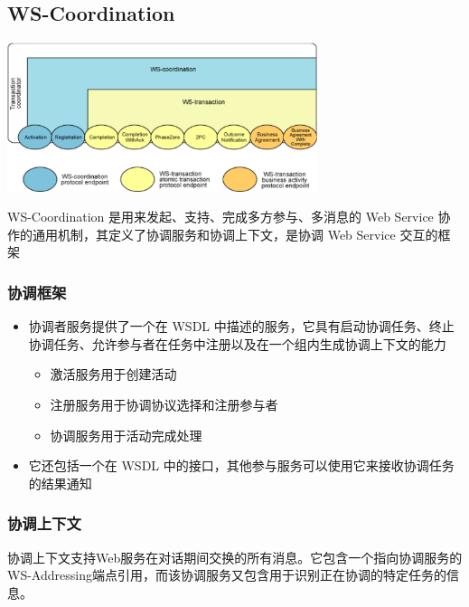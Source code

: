 \subsection{WS-Coordination}
\begin{table}
    \centering
    \vspace{-2em}
    \includegraphics[width=0.68\textwidth]{images/WS-Coordination.png}
    \vspace{-8.5em}
\end{table}
WS-Coordination 是用来发起、支持、完成多方参与、多消息的 Web Service 协作的通用机制，其定义了协调服务和协调上下文，是协调 Web Service 交互的框架

\subsubsection{协调框架}
\begin{itemize}
    \item 协调者服务提供了一个在 WSDL 中描述的服务，它具有启动协调任务、终止协调任务、允许参与者在任务中注册以及在一个组内生成协调上下文的能力
    \vspace{-0.8em}
    \begin{multicols}{2}
        \begin{itemize}
            \item 激活服务用于创建活动
            \item 注册服务用于协调协议选择和注册参与者
            \item 协调服务用于活动完成处理
        \end{itemize}
    \end{multicols}
    \vspace{-1em}
    \item 它还包括一个在 WSDL 中的接口，其他参与服务可以使用它来接收协调任务的结果通知
\end{itemize}

\subsubsection{协调上下文}
协调上下文支持Web服务在对话期间交换的所有消息。它包含一个指向协调服务的WS-Addressing端点引用，而该协调服务又包含用于识别正在协调的特定任务的信息。

